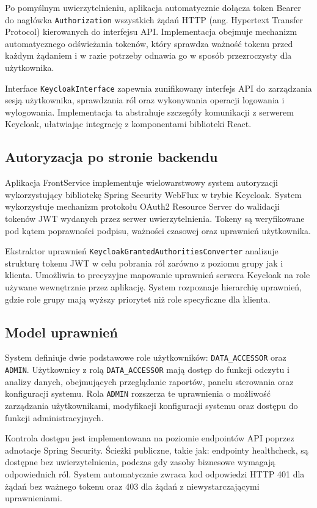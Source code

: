 Po pomyślnym uwierzytelnieniu, aplikacja automatycznie dołącza token Bearer do nagłówka \texttt{Authorization} wszystkich żądań HTTP (ang. Hypertext Transfer Protocol) kierowanych do interfejsu API. Implementacja obejmuje mechanizm automatycznego odświeżania tokenów, który sprawdza ważność tokenu przed każdym żądaniem i w razie potrzeby odnawia go w sposób przezroczysty dla użytkownika.

Interface \texttt{KeycloakInterface} zapewnia zunifikowany interfejs API do zarządzania sesją użytkownika, sprawdzania ról oraz wykonywania operacji logowania i wylogowania. Implementacja ta abstrahuje szczegóły komunikacji z serwerem Keycloak, ułatwiając integrację z komponentami biblioteki React.

\subsection{Autoryzacja po stronie backendu}

Aplikacja FrontService implementuje wielowarstwowy system autoryzacji wykorzystujący bibliotekę Spring Security WebFlux  w trybie Keycloak. System wykorzystuje mechanizm protokołu OAuth2 Resource Server do walidacji tokenów JWT wydanych przez serwer uwierzytelnienia. Tokeny są weryfikowane pod kątem poprawności podpisu, ważności czasowej oraz uprawnień użytkownika.

Ekstraktor uprawnień \texttt{KeycloakGrantedAuthoritiesConverter} analizuje strukturę tokenu JWT w celu pobrania ról zarówno z poziomu grupy jak i klienta. Umożliwia to precyzyjne mapowanie uprawnień serwera Keycloak na role używane wewnętrznie przez aplikację. System rozpoznaje hierarchię uprawnień, gdzie role grupy mają wyższy priorytet niż role specyficzne dla klienta.

\subsection{Model uprawnień}

System definiuje dwie podstawowe role użytkowników: \texttt{DATA\_ACCESSOR} oraz \texttt{ADMIN}. Użytkownicy z rolą \texttt{DATA\_ACCESSOR} mają dostęp do funkcji odczytu i analizy danych, obejmujących przeglądanie raportów, panelu sterowania oraz konfiguracji systemu. Rola \texttt{ADMIN} rozszerza te uprawnienia o możliwość zarządzania użytkownikami, modyfikacji konfiguracji systemu oraz dostępu do funkcji administracyjnych.

Kontrola dostępu jest implementowana na poziomie endpointów API poprzez adnotacje Spring Security. Ścieżki publiczne, takie jak: endpointy healthcheck, są dostępne bez uwierzytelnienia, podczas gdy zasoby biznesowe wymagają odpowiednich ról. System automatycznie zwraca kod odpowiedzi HTTP 401 dla żądań bez ważnego tokenu oraz 403 dla żądań z niewystarczającymi uprawnieniami.

